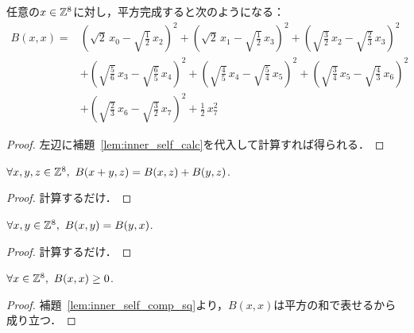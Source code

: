 \begin{lem}
  \label{lem:inner_self_comp_sq}
  \leanok
  任意の$x \in \mathbb{Z}^8$に対し，平方完成すると次のようになる：
  \begin{equation}
    \begin{split}
      B(x, x) ={}& \left( \sqrt{2} \, x_0 - \sqrt{\frac{1}{2}} \, x_2 \right)^2 + \left( \sqrt{2} \, x_1 - \sqrt{\frac{1}{2}} \, x_3 \right)^2 + \left( \sqrt{\frac{3}{2}} \, x_2 - \sqrt{\frac{2}{3}} \, x_3 \right)^2 \\
      & + \left( \sqrt{\frac{5}{6}} \, x_3 - \sqrt{\frac{6}{5}} \, x_4 \right)^2 + \left( \sqrt{\frac{4}{5}} \, x_4 - \sqrt{\frac{5}{4}} \, x_5 \right)^2 + \left( \sqrt{\frac{3}{4}} \, x_5 - \sqrt{\frac{4}{3}} \, x_6 \right)^2 \\
      & + \left( \sqrt{\frac{2}{3}} \, x_6 - \sqrt{\frac{3}{2}} \, x_7 \right)^2 + \frac{1}{2} \, x_7^2
    \end{split}
  \end{equation}
\end{lem}

\begin{proof}
  \leanok
  左辺に補題~\ref{lem:inner_self_calc}を代入して計算すれば得られる．
\end{proof}

\begin{thm}
  \label{thm:add_inner}
  \leanok
  $\forall x, y, z \in \mathbb{Z}^8,\ B(x+y, z) = B(x, z) + B(y, z)$.
\end{thm}

\begin{proof}
  \leanok
  計算するだけ．
\end{proof}

\begin{thm}
  \label{thm:inner_sym}
  \leanok
  $\forall x, y \in \mathbb{Z}^8,\ B(x, y) = B(y, x)$.
\end{thm}

\begin{proof}
  \leanok
  計算するだけ．
\end{proof}

\begin{thm}
  \label{thm:inner_self}
  \leanok
  $\forall x \in \mathbb{Z}^8,\ B(x, x) \ge 0$.
\end{thm}

\begin{proof}
  \leanok
  補題~\ref{lem:inner_self_comp_sq}より，$B(x, x)$は平方の和で表せるから成り立つ．
\end{proof}


